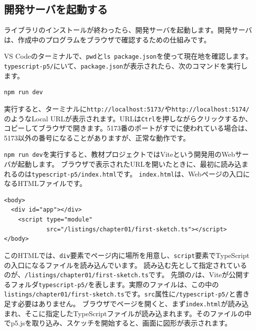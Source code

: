 \subsection{開発サーバを起動する}

ライブラリのインストールが終わったら、開発サーバを起動します。開発サーバは、作成中のプログラムをブラウザで確認するための仕組みです。


VS Codeのターミナルで、\texttt{pwd}と\texttt{ls package.json}を使って現在地を確認します。
\texttt{typescript-p5/}にいて、\texttt{package.json}が表示されたら、次のコマンドを実行します。

\begin{listing}[htbp]
\begin{verbatim}
npm run dev
\end{verbatim}
\caption{開発サーバを起動するコマンド}
\label{lst:chapter01-npm-run-dev}
\end{listing}

実行すると、ターミナルに\texttt{http://localhost:5173/}や\texttt{http://localhost:5174/}のようなLocal URLが表示されます。URLは\texttt{Ctrl}を押しながらクリックするか、コピーしてブラウザで開きます。5173番のポートがすでに使われている場合は、5173以外の番号になることがありますが、正常な動作です。

\texttt{npm run dev}を実行すると、教材プロジェクトではViteという開発用のWebサーバが起動します。
ブラウザで表示されたURLを開いたときに、最初に読み込まれるのは\texttt{typescript-p5/index.html}です。
\texttt{index.html}は、Webページの入口になるHTMLファイルです。

\begin{listing}[htbp]
\begin{verbatim}
<body>
  <div id="app"></div>
    <script type="module"
            src="/listings/chapter01/first-sketch.ts"></script>
</body>
\end{verbatim}
\caption{\texttt{index.html}から最初のサンプルを読み込む部分}
\label{lst:chapter01-index-html-main-ts}
\end{listing}

このHTMLでは、\texttt{div}要素でページ内に場所を用意し、\texttt{script}要素でTypeScriptの入口になるファイルを読み込んでいます。
読み込む先として指定されているのが、\texttt{/listings/chapter01/first-sketch.ts}です。
先頭の\texttt{/}は、Viteが公開するフォルダ\texttt{typescript-p5/}を表します。実際のファイルは、この中の\texttt{listings/chapter01/first-sketch.ts}です。\texttt{src}属性に\texttt{/typescript-p5/}と書き足す必要はありません。
ブラウザでページを開くと、まず\texttt{index.html}が読み込まれ、そこに指定したTypeScriptファイルが読み込まれます。そのファイルの中でp5.jsを取り込み、スケッチを開始すると、画面に図形が表示されます。

